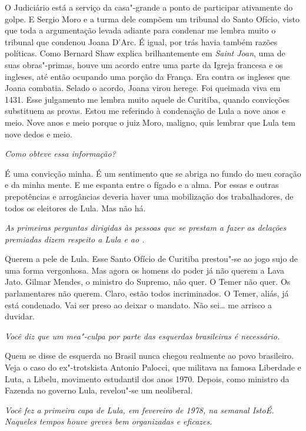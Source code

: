 \normalfont 
O Judiciário está a serviço da casa"-grande a ponto de
participar ativamente do golpe. E Sergio Moro e a turma dele compõem um
tribunal do Santo Ofício, visto que toda a argumentação levada adiante
para condenar me lembra muito o tribunal que condenou Joana D'Arc. É
igual, por trás havia também razões políticas. Como Bernard Shaw explica
brilhantemente em \emph{Saint Joan}, uma de suas obras"-primas, houve um
acordo entre uma parte da Igreja francesa e os ingleses, até então
ocupando uma porção da França. Era contra os ingleses que Joana
combatia. Selado o acordo, Joana virou herege. Foi queimada viva em
1431. Esse julgamento me lembra muito aquele de Curitiba, quando
convicções substituem as provas. Estou me referindo à condenação de Lula
a nove anos e meio. Nove anos e meio porque o juiz Moro, maligno, quis
lembrar que Lula tem nove dedos e meio.

\itshape
Como obteve essa informação?

\normalfont 
É uma convicção minha. É um sentimento que se abriga no
fundo do meu coração e da minha mente. E me espanta entre o fígado e a
alma. Por essas e outras prepotências e arrogâncias deveria haver uma
mobilização dos trabalhadores, de todos os eleitores de Lula. Mas não
há.

\itshape
As primeiras perguntas dirigidas às pessoas que se
prestam a fazer as delações premiadas dizem respeito a Lula e ao .

\normalfont 
Querem a pele de Lula. Esse Santo Ofício de Curitiba
prestou"-se ao jogo sujo de uma forma vergonhosa. Mas agora os homens do
poder já não querem a Lava Jato. Gilmar Mendes, o ministro do Supremo,
não quer. O Temer não quer. Os parlamentares não querem. Claro, estão
todos incriminados. O Temer, aliás, já está condenado. Vai ser preso ao
deixar o mandato. Não sei… me arrisco a duvidar.

\itshape
Você diz que um \emph{mea"-culpa} por parte das
esquerdas brasileiras é necessário.

\normalfont 
Quem se disse de esquerda no Brasil nunca chegou
realmente ao povo brasileiro. Veja o caso do ex"-trotskista Antonio
Palocci, que militava na famosa Liberdade e Luta, a Libelu, movimento
estudantil dos anos 1970. Depois, como ministro da Fazenda no governo
Lula, revelou"-se um neoliberal.

\itshape
Você fez a primeira capa de Lula, em fevereiro de 1978,
na semanal \emph{IstoÉ}. Naqueles tempos houve greves bem organizadas e
eficazes.

